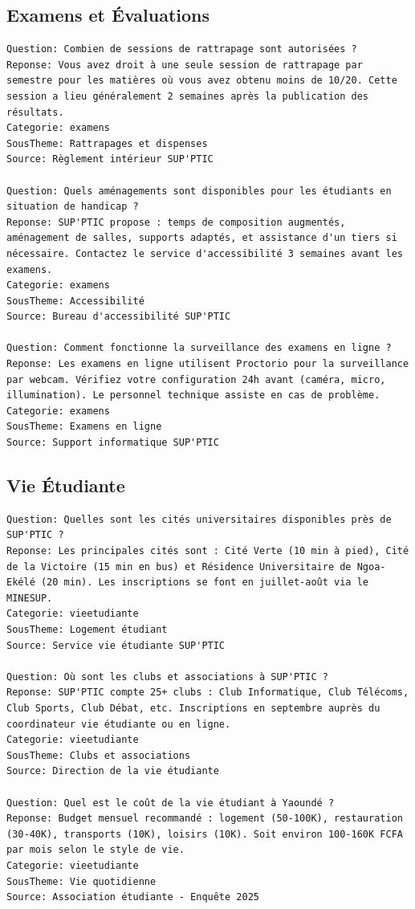\documentclass[11pt,a4paper]{article}
\begin{document}
\subsection{Examens et Évaluations}
\begin{lstlisting}
Question: Combien de sessions de rattrapage sont autorisées ?
Reponse: Vous avez droit à une seule session de rattrapage par semestre pour les matières où vous avez obtenu moins de 10/20. Cette session a lieu généralement 2 semaines après la publication des résultats.
Categorie: examens
SousTheme: Rattrapages et dispenses
Source: Règlement intérieur SUP'PTIC

Question: Quels aménagements sont disponibles pour les étudiants en situation de handicap ?
Reponse: SUP'PTIC propose : temps de composition augmentés, aménagement de salles, supports adaptés, et assistance d'un tiers si nécessaire. Contactez le service d'accessibilité 3 semaines avant les examens.
Categorie: examens
SousTheme: Accessibilité
Source: Bureau d'accessibilité SUP'PTIC

Question: Comment fonctionne la surveillance des examens en ligne ?
Reponse: Les examens en ligne utilisent Proctorio pour la surveillance par webcam. Vérifiez votre configuration 24h avant (caméra, micro, illumination). Le personnel technique assiste en cas de problème.
Categorie: examens
SousTheme: Examens en ligne
Source: Support informatique SUP'PTIC
\end{lstlisting}

\subsection{Vie Étudiante}
\begin{lstlisting}
Question: Quelles sont les cités universitaires disponibles près de SUP'PTIC ?
Reponse: Les principales cités sont : Cité Verte (10 min à pied), Cité de la Victoire (15 min en bus) et Résidence Universitaire de Ngoa-Ekélé (20 min). Les inscriptions se font en juillet-août via le MINESUP.
Categorie: vieetudiante
SousTheme: Logement étudiant
Source: Service vie étudiante SUP'PTIC

Question: Où sont les clubs et associations à SUP'PTIC ?
Reponse: SUP'PTIC compte 25+ clubs : Club Informatique, Club Télécoms, Club Sports, Club Débat, etc. Inscriptions en septembre auprès du coordinateur vie étudiante ou en ligne.
Categorie: vieetudiante
SousTheme: Clubs et associations
Source: Direction de la vie étudiante

Question: Quel est le coût de la vie étudiant à Yaoundé ?
Reponse: Budget mensuel recommandé : logement (50-100K), restauration (30-40K), transports (10K), loisirs (10K). Soit environ 100-160K FCFA par mois selon le style de vie.
Categorie: vieetudiante
SousTheme: Vie quotidienne
Source: Association étudiante - Enquête 2025
\end{lstlisting}
\end{document}
